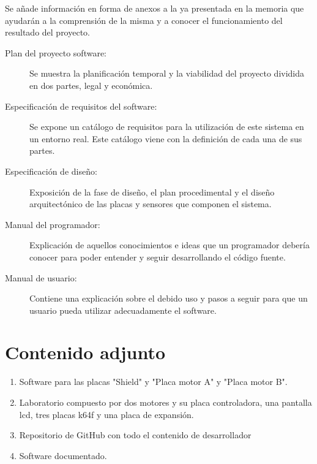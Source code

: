 Se añade información en forma de anexos a la ya presentada en la memoria que ayudarán a la comprensión de la misma y a conocer el funcionamiento del resultado del proyecto.
\begin{description}
	\item[Plan del proyecto software:] Se muestra la planificación temporal y la viabilidad del proyecto dividida en dos partes, legal y económica.

	\item[Especificación de requisitos del software:] Se expone un catálogo de requisitos para la utilización de este sistema en un entorno real. Este catálogo viene con la definición de cada una de sus partes.

	\item[Especificación de diseño:] Exposición de la fase de diseño, el plan procedimental y el diseño arquitectónico de las placas y sensores que componen el sistema.

	\item[Manual del programador:] Explicación de aquellos conocimientos e ideas que un programador debería conocer para poder entender y seguir desarrollando el código fuente.

	\item[Manual de usuario:] Contiene una explicación sobre el debido uso y pasos a seguir para que un usuario pueda utilizar adecuadamente el software.
\end{description}

\section{Contenido adjunto}\label{sec:Contenido adjunto}
\begin{enumerate}
\item Software para las placas "Shield" y "Placa motor A" y "Placa motor B".
\item Laboratorio compuesto por dos motores y su placa controladora, una pantalla lcd, tres placas k64f y una placa de expansión.
\item Repositorio de GitHub \cite{EOD1001} con todo el contenido de desarrollador
\item Software documentado.
\end{enumerate}
